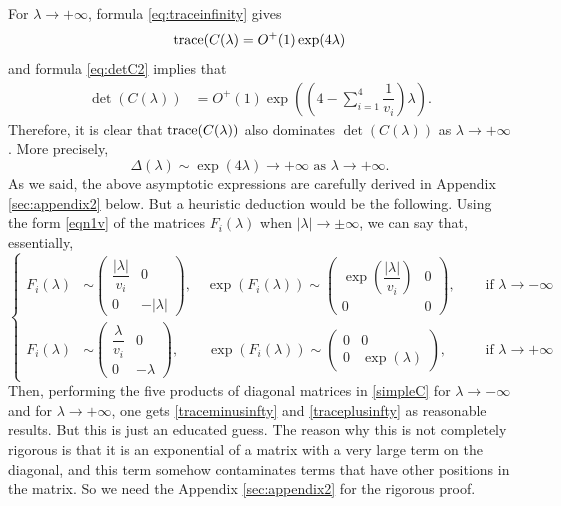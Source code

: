 \documentclass[a4paper]{article}
\numberwithin{equation}{section}
\begin{document}
For $\lambda \to+\infty$, formula \eqref{eq:traceinfinity} gives
\begin{equation}\label{traceplusinfty}
{\rm trace}(C(\lambda) = O^+(1) \exp({4\lambda})
\end{equation}
and formula \eqref{eq:detC2} implies that
\begin{align*}%
\det(C(\lambda)) &=O^+(1)\exp\left(  \left(4-\sum_{i=1}^4\dfrac{1}{v_i} \right)\lambda    \right).
\end{align*}
Therefore, it is clear that ${\rm trace}(C(\lambda))$ also dominates $\det(C(\lambda))$ as $\lambda\to +\infty$. More precisely,
$$\Delta(\lambda) \sim \exp(4\lambda)\to +\infty\textrm{ as }\lambda\to +\infty.$$
As we said, the above asymptotic expressions are carefully derived in Appendix \ref{sec:appendix2} below. But a heuristic deduction would be the following. Using the form \eqref{eqn1v} of the matrices $F_i(\lambda)$ when $|\lambda|\to \pm\infty$, we can say that, essentially,
\[
\left\{\begin{aligned}
F_i(\lambda) &\sim \begin{pmatrix}  \dfrac{|\lambda|}{v_i} & 0\\ 0 & -|\lambda|\end{pmatrix},
 \quad  \exp(F_i(\lambda)) \sim  \begin{pmatrix}  \exp\left(\dfrac{|\lambda|}{v_i} \right)& 0\\ 0 & 0\end{pmatrix},
& \quad\text{ if } \lambda\to -\infty \\[1em]
F_i(\lambda) &\sim  \begin{pmatrix}  \dfrac{\lambda}{v_i} & 0\\ 0 & -\lambda\end{pmatrix},
 \qquad  \exp(F_i(\lambda)) \sim   \begin{pmatrix}  0& 0\\ 0 & \exp(\lambda)\end{pmatrix},
& \quad \text{ if } \lambda\to +\infty
\end{aligned}\right.
\]
Then, performing the five products of diagonal matrices in \eqref{simpleC} for $\lambda\to-\infty$ and for $\lambda\to +\infty$, one gets \eqref{traceminusinfty} and \eqref{traceplusinfty} as reasonable results. But this is just an educated guess. The reason why this is not completely rigorous is that it is an exponential of a matrix with a very large term on the diagonal, and this term somehow contaminates terms that have other positions in the matrix. So we need the Appendix \ref{sec:appendix2} for the rigorous proof.
\end{document}
